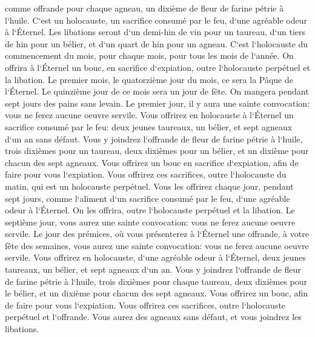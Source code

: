 \verse comme offrande pour chaque agneau, un dixième de fleur de farine pétrie à l`huile. C`est un holocauste, un sacrifice consumé par le feu, d`une agréable odeur à l`Éternel. 
\verse Les libations seront d`un demi-hin de vin pour un taureau, d`un tiers de hin pour un bélier, et d`un quart de hin pour un agneau. C`est l`holocauste du commencement du mois, pour chaque mois, pour tous les mois de l`année. 
\verse On offrira à l`Éternel un bouc, en sacrifice d`expiation, outre l`holocauste perpétuel et la libation. 
\verse Le premier mois, le quatorzième jour du mois, ce sera la Pâque de l`Éternel. 
\verse Le quinzième jour de ce mois sera un jour de fête. On mangera pendant sept jours des pains sans levain. 
\verse Le premier jour, il y aura une sainte convocation: vous ne ferez aucune oeuvre servile. 
\verse Vous offrirez en holocauste à l`Éternel un sacrifice consumé par le feu: deux jeunes taureaux, un bélier, et sept agneaux d`un an sans défaut. 
\verse Vous y joindrez l`offrande de fleur de farine pétrie à l`huile, trois dixièmes pour un taureau, deux dixièmes pour un bélier, 
\verse et un dixième pour chacun des sept agneaux. 
\verse Vous offrirez un bouc en sacrifice d`expiation, afin de faire pour vous l`expiation. 
\verse Vous offrirez ces sacrifices, outre l`holocauste du matin, qui est un holocauste perpétuel. 
\verse Vous les offrirez chaque jour, pendant sept jours, comme l`aliment d`un sacrifice consumé par le feu, d`une agréable odeur à l`Éternel. On les offrira, outre l`holocauste perpétuel et la libation. 
\verse Le septième jour, vous aurez une sainte convocation: vous ne ferez aucune oeuvre servile. 
\verse Le jour des prémices, où vous présenterez à l`Éternel une offrande, à votre fête des semaines, vous aurez une sainte convocation: vous ne ferez aucune oeuvre servile. 
\verse Vous offrirez en holocauste, d`une agréable odeur à l`Éternel, deux jeunes taureaux, un bélier, et sept agneaux d`un an. 
\verse Vous y joindrez l`offrande de fleur de farine pétrie à l`huile, trois dixièmes pour chaque taureau, deux dixièmes pour le bélier, 
\verse et un dixième pour chacun des sept agneaux. 
\verse Vous offrirez un bouc, afin de faire pour vous l`expiation. 
\verse Vous offrirez ces sacrifices, outre l`holocauste perpétuel et l`offrande. Vous aurez des agneaux sans défaut, et vous joindrez les libations. 

